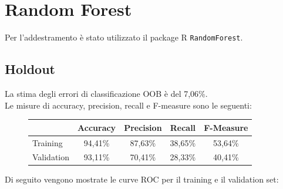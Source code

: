 \section{Random Forest}
Per l'addestramento è stato utilizzato il package R \texttt{RandomForest}.

\subsection{Holdout}
La stima degli errori di classificazione OOB è del 7,06\%.\\

Le misure di accuracy, precision, recall e F-measure sono le seguenti:
\begin{figure}[H]
	\centering
	\begin{tabular}{lcccc}
		\toprule
		& \textbf{Accuracy} & \textbf{Precision} & \textbf{Recall} & 
		\textbf{F-Measure}  \\
		\midrule
		Training	& 94,41\% & 87,63\% & 38,65\% & 53,64\%    	\\ 
		Validation	& 93,11\% & 70,41\% & 28,33\% & 40,41\%   	\\ 
		\bottomrule
	\end{tabular}
	\label{tab:rf_h_performance}
\end{figure}

Di seguito vengono mostrate le curve ROC per il training e il validation set:


